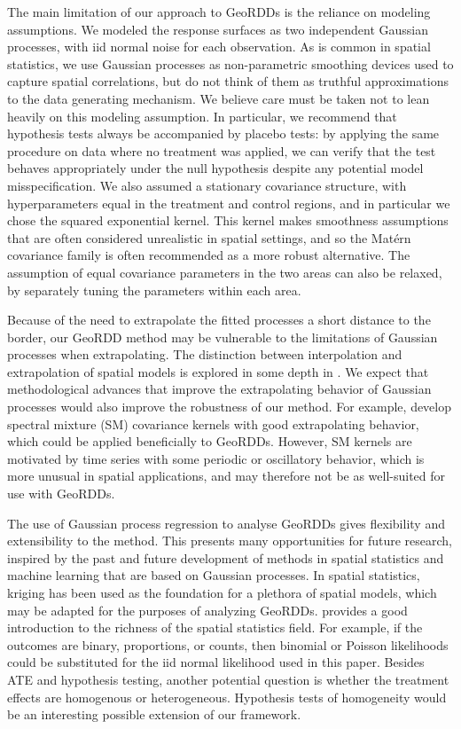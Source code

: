 \documentclass[letter]{article}
\renewcommand{\cite}[1]{\citet{#1}}
\begin{document}
    	The main limitation of our approach to GeoRDDs is the reliance on modeling assumptions.
We modeled the response surfaces as two independent Gaussian processes, with iid normal noise for each observation.
As is common in spatial statistics, we use Gaussian processes as non-parametric smoothing devices used to capture spatial correlations, but do not think of them as truthful approximations to the data generating mechanism.
We believe care must be taken not to lean heavily on this modeling assumption.
In particular, we recommend that hypothesis tests always be accompanied by placebo tests:
by applying the same procedure on data where no treatment was applied, we can verify that the test behaves appropriately under the null hypothesis despite any potential model misspecification.
We also assumed a stationary covariance structure, with hyperparameters equal in the treatment and control regions, and in particular we chose the squared exponential kernel.
This kernel makes smoothness assumptions that are often considered unrealistic in spatial settings, and so the Matérn covariance family is often recommended as a more robust alternative.
The assumption of equal covariance parameters in the two areas can also be relaxed, by separately tuning the parameters within each area.

Because of the need to extrapolate the fitted processes a short distance to the border, our GeoRDD method may be vulnerable to the limitations of Gaussian processes when extrapolating.
The distinction between interpolation and extrapolation of spatial models is explored in some depth in \cite{stein2012interpolation}.
We expect that methodological advances that improve the extrapolating behavior of Gaussian processes would also improve the robustness of our method.
For example, \cite{wilson2013gaussian} develop spectral mixture (SM) covariance kernels with good extrapolating behavior, which could be applied beneficially to GeoRDDs.
However, SM kernels are motivated by time series with some periodic or oscillatory behavior, which is more unusual in spatial applications, and may therefore not be as well-suited for use with GeoRDDs.
    


    	The use of Gaussian process regression to analyse GeoRDDs gives flexibility and extensibility to the method.
This presents many opportunities for future research, inspired by the past and future development of methods in spatial statistics and machine learning that are based on Gaussian processes.
In spatial statistics, kriging has been used as the foundation for a plethora of spatial models, which may be adapted for the purposes of analyzing GeoRDDs.
\cite{banerjee2014hierarchical} provides a good introduction to the richness of the spatial statistics field.
For example, if the outcomes are binary, proportions, or counts, then binomial or Poisson likelihoods could be substituted for the iid normal likelihood used in this paper.
Besides ATE and hypothesis testing, another potential question is whether the treatment effects are homogenous or heterogeneous.
Hypothesis tests of homogeneity would be an interesting possible extension of our framework.
\end{document}
